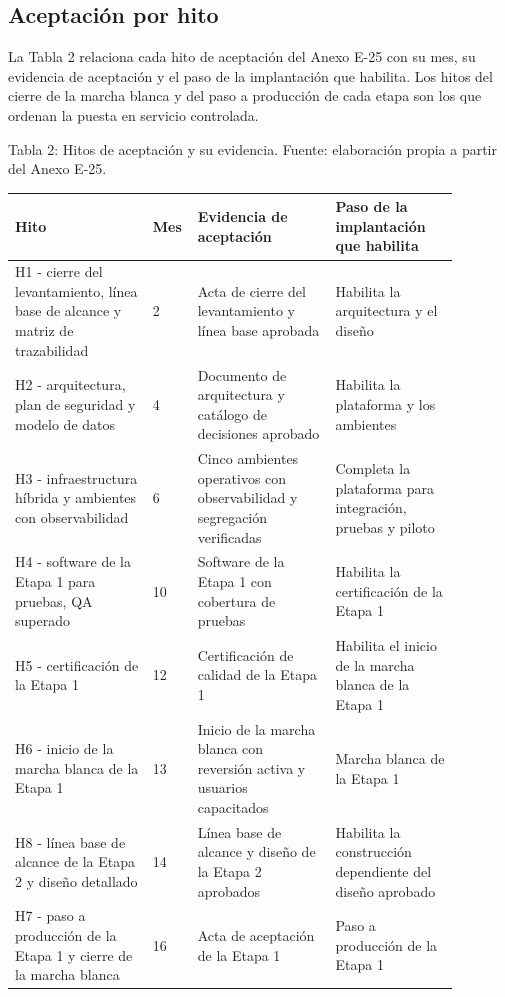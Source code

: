 \documentclass[11pt]{article}
\begin{document}
\subsection*{Aceptación por hito}

La Tabla 2 relaciona cada hito de aceptación del Anexo E-25 con su mes, su evidencia de aceptación y el paso de la implantación que habilita. Los hitos del cierre de la marcha blanca y del paso a producción de cada etapa son los que ordenan la puesta en servicio controlada.

Tabla 2: Hitos de aceptación y su evidencia. Fuente: elaboración propia a partir del Anexo E-25.

\begin{longtable}{@{}p{0.290\linewidth}p{0.048\linewidth}p{0.290\linewidth}p{0.251\linewidth}@{}}
\toprule
\textbf{Hito} & \textbf{Mes} & \textbf{Evidencia de aceptación} & \textbf{Paso de la implantación que habilita} \\
\midrule
\endhead
\bottomrule
\endlastfoot
H1 - cierre del levantamiento, línea base de alcance y matriz de trazabilidad & 2 & Acta de cierre del levantamiento y línea base aprobada & Habilita la arquitectura y el diseño \\
H2 - arquitectura, plan de seguridad y modelo de datos & 4 & Documento de arquitectura y catálogo de decisiones aprobado & Habilita la plataforma y los ambientes \\
H3 - infraestructura híbrida y ambientes con observabilidad & 6 & Cinco ambientes operativos con observabilidad y segregación verificadas & Completa la plataforma para integración, pruebas y piloto \\
H4 - software de la Etapa 1 para pruebas, QA superado & 10 & Software de la Etapa 1 con cobertura de pruebas & Habilita la certificación de la Etapa 1 \\
H5 - certificación de la Etapa 1 & 12 & Certificación de calidad de la Etapa 1 & Habilita el inicio de la marcha blanca de la Etapa 1 \\
H6 - inicio de la marcha blanca de la Etapa 1 & 13 & Inicio de la marcha blanca con reversión activa y usuarios capacitados & Marcha blanca de la Etapa 1 \\
H8 - línea base de alcance de la Etapa 2 y diseño detallado & 14 & Línea base de alcance y diseño de la Etapa 2 aprobados & Habilita la construcción dependiente del diseño aprobado \\
H7 - paso a producción de la Etapa 1 y cierre de la marcha blanca & 16 & Acta de aceptación de la Etapa 1 & Paso a producción de la Etapa 1 \\

\end{longtable}
\end{document}
